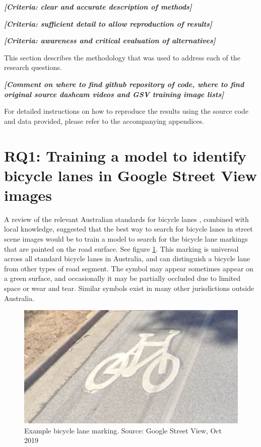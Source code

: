 \documentclass[11pt,twoside]{report}
\newcommand{\remark}[1]{{\bf \em [\marginpar{$\Leftarrow$}#1]}}
\begin{document}
\remark{Criteria: clear and accurate description of methods}

\remark{Criteria: sufficient detail to allow reproduction of results}

\remark{Criteria: awareness and critical evaluation of alternatives}

This section describes the methodology that was used to address each of the research questions.

\remark{Comment on where to find github repository of code, where to find original source dashcam videos and GSV training image lists}

For detailed instructions on how to reproduce the results using the source code and data provided, please refer to the accompanying appendices.

\section{RQ1: Training a model to identify bicycle lanes in Google Street View images}

A review of the relevant Australian standards for bicycle lanes \cite{standards}, combined with local knowledge, suggested that the best way to search for bicycle lanes in street scene images would be to train a model to search for the bicycle lane markings that are painted on the road surface.  See figure \ref{fig:symbol}.  This marking is universal across all standard bicycle lanes in Australia, and can distinguish a bicycle lane from other types of road segment.  The symbol may appear sometimes appear on a green surface, and occasionally it may be partially occluded due to limited space or wear and tear.  Similar symbols exist in many other jurisdictions outside Australia.

\begin{figure}[h]
\centering
\includegraphics{f001_symbol.png}
\caption{Example bicycle lane marking.  Source: Google Street View, Oct 2019}
\label{fig:symbol}
\end{figure}
\end{document}
